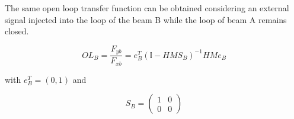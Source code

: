 The same open loop transfer function can be obtained considering an external signal injected into the loop of the beam B while the loop of beam A remains closed.

\begin{equation}
OL_{B}=\frac{F_{yb}}{F_{xb}}=e_B^{T}(\mathbb{I}-HMS_B)^{-1}HMe_B
\end{equation}

with $e_B^{T}=(0,1)$ and %

\begin{equation}
S_B=
\left( \begin{array}{cc}
1 & 0\\
0 & 0
\end{array} \right)
\end{equation}


